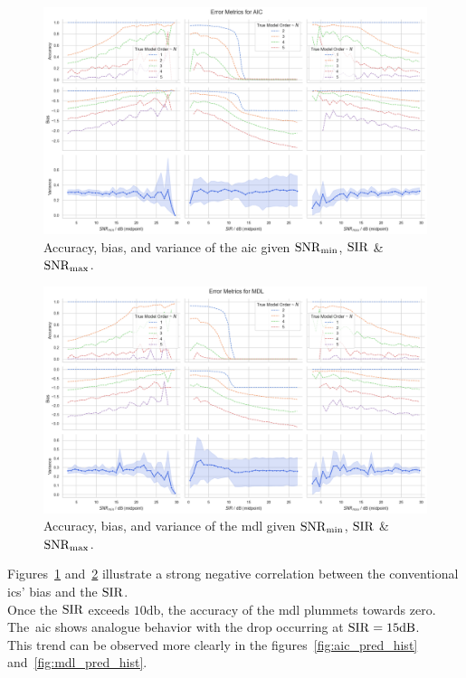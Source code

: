 \begin{figure}[H]
    \centering
    \includegraphics[width=\textwidth]{figures/07_Evaluation/snr_sir/aic_3x3.png}
    \caption{Accuracy, bias, and variance of the \gls{aic} given \( \mathrm{SNR}_{\min} \), \( \mathrm{SIR} \) \& \( \mathrm{SNR}_{\max} \).}
    \label{fig:eval_grids/aic}
\end{figure}
\begin{figure}[H]
    \centering
    \includegraphics[width=\textwidth]{figures/07_Evaluation/snr_sir/mdl_3x3.png}
    \caption{Accuracy, bias, and variance of the \gls{mdl} given \( \mathrm{SNR}_{\min} \), \( \mathrm{SIR} \) \& \( \mathrm{SNR}_{\max} \).}
    \label{fig:eval_grids/mdl}
\end{figure}

Figures~\ref{fig:eval_grids/aic} and~\ref{fig:eval_grids/mdl} illustrate a strong negative correlation between the conventional
\glspl{ic}' bias and the \( \mathrm{SIR} \). \\
Once the \( \mathrm{SIR} \) exceeds \( 10 \si{\decibel} \), the accuracy of the \gls{mdl} plummets towards zero. The~\gls{aic} shows
analogue behavior with the drop occurring at \( \SIR = 15 \si{\decibel} \). \\
This trend can be observed more clearly in the figures~\ref{fig:aic_pred_hist} and~\ref{fig:mdl_pred_hist}.

